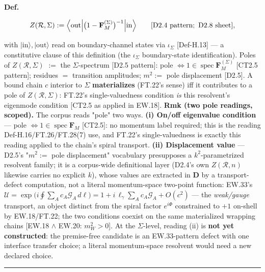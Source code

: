 \begin{definition}\label{tag:Def-H-16}
\textbf{Def.}

\[
Z(\mathcal R,\Sigma):=\Bigl\langle\mathrm{out}\Bigl|\bigl(1-\mathbf F_M^{(\Sigma)}\bigr)^{-1}\Bigr|\mathrm{in}\Bigr\rangle\qquad[\mathrm{D2.4}\ \text{pattern};\ \mathrm{D2.8}\ \text{sheet}],
\]

with $|\mathrm{in}\rangle,|\mathrm{out}\rangle$ read on boundary-channel states via $\iota_\Sigma$ [Def-H.13] — a constitutive clause of this definition (the $\iota_\Sigma$ boundary-state identification). Poles of $Z(\mathcal R,\Sigma)$ $:=$ the $\Sigma$-spectrum [D2.5 pattern]: pole $\iff1\in\operatorname{spec}\mathbf F_M^{(\Sigma)}$ [CT2.5 pattern]; residues $=$ transition amplitudes; $m^2:=$ pole displacement [D2.5]. A bound chain $c$ interior to $\Sigma$ \textbf{materializes} (FT.22's sense) iff it contributes to a pole of $Z(\mathcal R,\Sigma)$: FT.22's single-valuedness condition \textit{is} this resolvent's eigenmode condition [CT2.5 as applied in EW.18]. \textbf{Rmk (two pole readings, scoped).} The corpus reads "pole" two ways. \textbf{(i) On/off eigenvalue condition} — pole $\iff1\in\operatorname{spec}\mathbf F_M$ [CT2.5]: no momentum label required; this is the reading Def-H.16/FT.26/FT.28(7) use, and FT.22's single-valuedness is exactly this reading applied to the chain's spiral transport. \textbf{(ii) Displacement value} — D2.5's "$m^2:=$ pole displacement" vocabulary presupposes a $k^2$-parametrized resolvent family; it is a corpus-wide definitional layer (D2.4's own $Z(\mathcal R,n)$ likewise carries no explicit $k$), whose values are extracted in \textbf{D} by a transport-defect computation, not a literal momentum-space two-point function: EW.33's $\mathcal U=\exp\bigl(i\oint\sum_Ac_A\mathcal G_A\,d\ell\bigr)=1+i\,\ell_\gamma\sum_Ac_A\mathcal G_A+O(c^2)$ — the \textit{weak/gauge} transport, an object distinct from the spiral factor $e^{i\Phi}$ constrained to $+1$ on-shell by EW.18/FT.22; the two conditions coexist on the same materialized wrapping chains [EW.18 $\wedge$ EW.20: $m_W^2>0$]. At the $\Sigma$-level, reading (ii) is \textbf{not yet constructed}: the premise-free candidate is an EW.33-pattern defect with one interface transfer choice; a literal momentum-space resolvent would need a new declared choice.

\vspace{2pt}\noindent\rule{\textwidth}{0.4pt}\vspace{2pt}

\end{definition}


